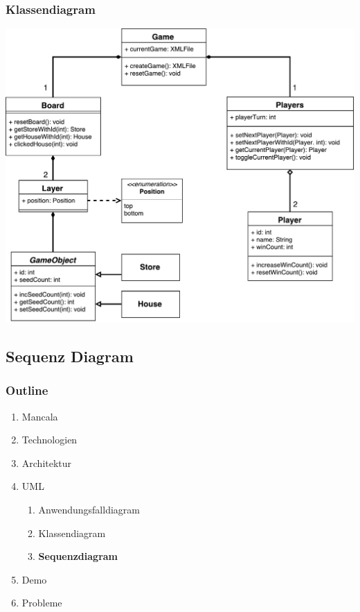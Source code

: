 \documentclass[
	10pt,
	t		%
]{beamer}
\begin{document}
\begin{frame}
\frametitle{Klassendiagram}
\begin{center}
\includegraphics[scale=0.32]{./../Diagrams/Classes.pdf}
\end{center}
\end{frame}

\subsection{Sequenz Diagram}
\begin{frame}
\frametitle{Outline}
\begin{enumerate}
\item Mancala
\item Technologien
\item Architektur
\item UML
\begin{enumerate}
\item Anwendungsfalldiagram
\item Klassendiagram
\item \textbf{Sequenzdiagram}
\end{enumerate}
\item Demo
\item Probleme
\end{enumerate}
\end{frame}
\end{document}
